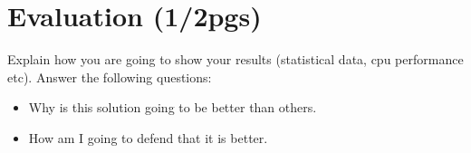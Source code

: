 
% 
% 

\section{Evaluation (1/2pgs)}
\label{sec:evaluation}
Explain how you are going to show your results (statistical data, cpu performance etc). Answer the following questions:
\begin{itemize}
  \item Why is this solution going to be better than others.
  \item How am I going to defend that it is better.
\end{itemize}